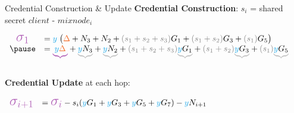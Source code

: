 \begin{frame}{Credential Construction \& Update}
    \textbf{Credential Construction}:\hfill {\footnotesize\color{gray} $s_i$ = shared secret $client$ - $mixnode_i$}
    \begin{center}
        $\begin{array}{cl}
            {\text{\color{Orchid}\LARGE$\sigma_1$}} & = {\color{Cerulean}y} \; \big({\color{Orange}\Delta} + N_3 + N_2 + {\color{gray}(s_1+s_2+s_3)} G_1 + {\color{gray}(s_1+s_2)} G_3 + {\color{gray}(s_1)} G_5\big)\\
            \pause
                & =  \underset{\annotMath{p0}{}}{\begingroup\color{Orchid}\underbrace{\color{black}{\color{Cerulean}y}{\color{Orange}\Delta}}\endgroup} + 
                \underset{\annotMath{p1}{}}{\begingroup\color{gray!50}\underbrace{\color{black}{\color{Cerulean}y}N_3}\endgroup} + 
                \underset{\annotMath{p2}{}}{\begingroup\color{gray!50}\underbrace{\color{black}{\color{Cerulean}y}N_2}\endgroup} + 
                {\color{gray}(s_1+s_2+s_3)}\underset{\annotMath{p3}{}}{\begingroup\color{gray!50}\underbrace{\color{black}{\color{Cerulean}y}G_1}\endgroup} + 
                {\color{gray}(s_1+s_2)}\underset{\annotMath{p4}{}}{\begingroup\color{gray!50}\underbrace{\color{black}{\color{Cerulean}y}G_3}\endgroup} + 
                {\color{gray}(s_1)}\underset{\annotMath{p5}{}}{\begingroup\color{gray!50}\underbrace{\color{black}{\color{Cerulean}y}G_5}\endgroup}\\
        \end{array}$
    \end{center}

    \vfill
    \pause

    \textbf{Credential Update} at each hop:
    \begin{center}
        $\begin{array}{cl}
            \text{\color{Orchid}\LARGE$\sigma_{i+1}$} & = \text{\color{Orchid}\LARGE$\sigma_i$} - s_i ({\color{Cerulean}y}G_1+{\color{Cerulean}y}G_3+{\color{Cerulean}y}G_5+{\color{Cerulean}y}G_7) - {\color{Cerulean}y}N_{i+1}\\
           \end{array}$
    \end{center}
 \end{frame}

